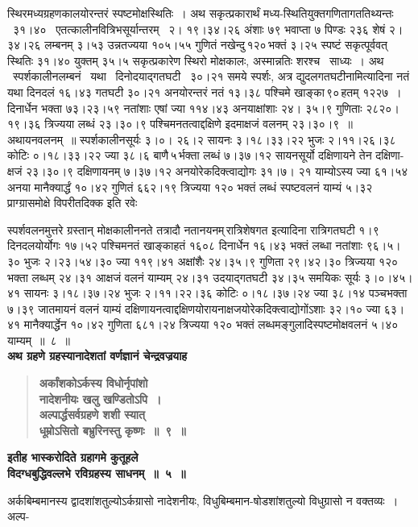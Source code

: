 \documentclass[11pt, openany]{book}
\begin{document}
\newpage

\begin{sloppypar}
\noindent स्थिरमध्यग्रहणकालयोरन्तरं स्पष्टमोक्षस्थितिः~। अथ सकृत्प्रकारार्थं मध्य-स्थितियुक्तगणितागततिथ्यन्तः ~३१।४० ~एतत्कालीनवित्रिभसूर्यान्तरम् ~२। १९।३४।२६ अंशाः ७९ भवाप्ता ७ पिण्डः २३६ शेषं २।३४।२६ लम्बनम् ३।५३ उन्नतज्यया १०५।५५ गुणितं नखेन्दु\textendash \,१२०\textendash \,भक्तं ३।२५ स्पष्टं सकृत्पूर्ववत् स्थितिः ३१।४० युक्तम् ३५।५ सकृत्प्रकारेण स्थिरो मोक्षकालः, अस्मान्नतिः शरश्च ~साध्यः~। अथ ~स्पर्शकालीनलम्बनं ~यथा ~दिनोदयाद्गतघटी ~३०।२१ समये \;स्पर्शः, \;अत्र \;द्युदलगतघटीनामित्यादिना \;नतं \;यथा \;दिनदलं \;१६।४३ गतघटी ३०।२१ अनयोरन्तरं नतं १३।३८ पश्चिमे खाङ्का\textendash \,९०\textendash \,हतम् १२२७~। दिनार्धेन भक्ता ७३।२३।५९ नतांशाः एषां ज्या ११४।४३ अनयाक्षांशाः २४। ३५।९ गुणिताः २८२०।१९।३६ त्रिज्यया लब्धं २३।३०।९ पश्चिमनतत्वाद्दक्षिणे इदमाक्षजं वलनम् २३।३०।९~॥ अथायनवलनम्~॥ स्पर्शकालीनसूर्यः ३।०। २६।२ सायनः ३।१८।३३।२२ भुजः २।११।२६।३८ कोटिः ०।१८।३३।२२ ज्या ३८।६ बाणै\textendash \,५\textendash \,र्भक्ता लब्धं ७।३७।१२ सायनसूर्यो दक्षिणायने तेन दक्षिणा-क्षजं २३।३०।९ दक्षिणायनम् ७।३७।१२ अनयोरेकदिक्त्वाद्योगः ३१।७। २१ याम्योऽस्य ज्या ६१।५४ अनया मानैक्यार्द्धं १०।४२ गुणितं ६६२।१९ त्रिज्यया १२० भक्तं लब्धं स्पष्टवलनं याम्यं ५।३२ प्राग्ग्रासमोक्षे विपरीतदिक्क इति रवेः
\end{sloppypar}

\newpage

\begin{sloppypar}
\noindent स्पर्शवलनमुत्तरे ग्रस्तान् मोक्षकालीननते तत्रादौ नतानयनम्\textendash \,रात्रिशेषगत इत्यादिना रात्रिगतघटी १।९ दिनदलयोर्योगः १७।५२ पश्चिमनतं खाङ्काहतं १६०८ दिनार्धेन १६।४३ भक्तं लब्धा नतांशाः ९६।५।३० भुजः २।२३।५४।३० ज्या ११९।४१ अक्षांशैः २४।३५।९ गुणिता २९।४२।३० त्रिज्यया १२० भक्ता लब्धम् २४।३१ आक्षजं वलनं याम्यम् २४।३१ उदयाद्गतघटी ३४।३५ समयिकः सूर्यः ३।०।४५।४१ सायनः ३।१८।३७।२४ भुजः २।११।२२।३६ कोटिः ०।१८।३७।२४ ज्या ३८।१४ पञ्चभक्ता ७।३९ जातमायनं वलनं याम्यं दक्षिणायनत्वाद्दक्षिणयोरायनाक्षजयोरेकदिक्त्वाद्योगोंऽशाः ३२।१० ज्या ६३।४१ मानैक्यार्द्धेन १०।४२ गुणिता ६८१।२४ त्रिज्यया १२० भक्तं लब्धमङ्गुलादिस्पष्टमोक्षवलनं ५।४० याम्यम्~॥~८~॥\\

{\small \textbf{अथ ग्रहणे ग्रहस्यानादेशतां वर्णज्ञानं चेन्द्रवज्रयाह\textendash }}

 \label{5.9}
\begin{quote}
{\large \textbf{{\color{purple}अर्कांशकोऽर्कस्य विधोर्नृपांशो \\
नादेशनीयः खलु खण्डितोऽपि~। \\
अल्पार्द्धसर्वग्रहणे शशी स्यात् \\
धूम्रोऽसितो बभ्रुरिनस्तु कृष्णः~॥~९~॥}}}
\end{quote}

\begin{center}
{\large \textbf{इतीह भास्करोदिते ग्रहागमे कुतूहले \\
विदग्धबुद्धिवल्लभे रविग्रहस्य साधनम्~॥~५~॥ }}
\end{center}

अर्कबिम्बमानस्य द्वादशांशतुल्योऽर्कग्रासो नादेशनीयः, विधुबिम्बमान-षोडशांशतुल्यो विधुग्रासो न वक्तव्यः~। अल्प-
\end{sloppypar}
\end{document}
